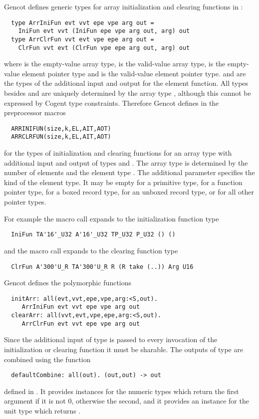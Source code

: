 Gencot defines generic types for array initialization and clearing functions in :
\begin{verbatim}
  type ArrIniFun evt vvt epe vpe arg out =
    IniFun evt vvt (IniFun epe vpe arg out, arg) out
  type ArrClrFun vvt evt vpe epe arg out =
    ClrFun vvt evt (ClrFun vpe epe arg out, arg) out
\end{verbatim}
where  is the empty-value array type,  is the valid-value array type,  is the empty-value
element pointer type and  is the valid-value element pointer type.  and 
are the types of the additional input and output for the element function. All types besides  and  are uniquely determined by the 
array type , although this cannot be expressed by Cogent type constraints. Therefore Gencot  defines in 
 the preprocessor macros
\begin{verbatim}
  ARRINIFUN(size,k,EL,AIT,AOT)
  ARRCLRFUN(size,k,EL,AIT,AOT)
\end{verbatim}
for the types of initialization and clearing functions for an array type  with additional input and output of types  and .
The array type  is determined by the number of elements  and the element type 
. The additional parameter  specifies the kind of the element type. It may be empty for a primitive type,
 for a function pointer type,  for a boxed record type,  for an unboxed record type, or  for 
all other pointer types. 

For example the macro call  expands to the initialization function type
\begin{verbatim}
  IniFun TA'16'_U32 A'16'_U32 TP_U32 P_U32 () ()
\end{verbatim}
and the macro call  expands to the clearing function type
\begin{verbatim}
  ClrFun A'300'U_R TA'300'U_R R (R take (..)) Arg U16
\end{verbatim}

Gencot defines the polymorphic functions
\begin{verbatim}
  initArr: all(evt,vvt,epe,vpe,arg:<S,out). 
     ArrIniFun evt vvt epe vpe arg out
  clearArr: all(vvt,evt,vpe,epe,arg:<S,out). 
     ArrClrFun evt vvt epe vpe arg out
\end{verbatim}
Since the additional input of type  is passed to every invocation of the initialization or clearing function
it must be sharable. The outputs of type  are combined using the function
\begin{verbatim}
  defaultCombine: all(out). (out,out) -> out
\end{verbatim}
defined in . It provides instances for the numeric types which return the first argument if it
is not 0, otherwise the second, and it provides an instance for the unit type \code{()} which returns \code{()}.


